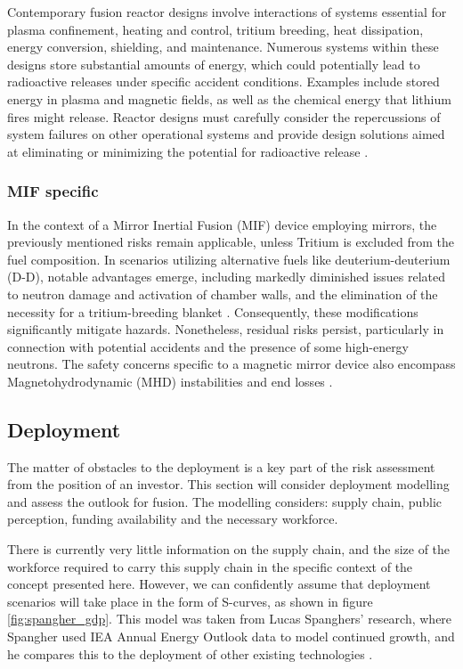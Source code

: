 Contemporary fusion reactor designs involve interactions of systems essential for plasma confinement, heating and control, tritium breeding, heat dissipation, energy conversion, shielding, and maintenance. Numerous systems within these designs store substantial amounts of energy, which could potentially lead to radioactive releases under specific accident conditions. Examples include stored energy in plasma and magnetic fields, as well as the chemical energy that lithium fires might release. Reactor designs must carefully consider the repercussions of system failures on other operational systems and provide design solutions aimed at eliminating or minimizing the potential for radioactive release \cite{crocker1983safety}.


\subsubsection{MIF specific}

In the context of a Mirror Inertial Fusion (MIF) device employing mirrors, the previously mentioned risks remain applicable, unless Tritium is excluded from the fuel composition. In scenarios utilizing alternative fuels like deuterium-deuterium (D-D), notable advantages emerge, including markedly diminished issues related to neutron damage and activation of chamber walls, and the elimination of the necessity for a tritium-breeding blanket \cite{post1980magnetic}. Consequently, these modifications significantly mitigate hazards. Nonetheless, residual risks persist, particularly in connection with potential accidents and the presence of some high-energy neutrons. The safety concerns specific to a magnetic mirror device also encompass Magnetohydrodynamic (MHD) instabilities and end losses \cite{post1980magnetic}. 

\subsection{Deployment}

The matter of obstacles to the deployment is a key part of the risk assessment from the position of an investor. This section will consider deployment modelling and assess the outlook for fusion. The modelling considers: supply chain, public perception, funding availability and the necessary workforce. 

There is currently very little information on the supply chain, and the size of the workforce required to carry this supply chain in the specific context of the concept presented here. However, we can confidently assume that deployment scenarios will take place in the form of S-curves, as shown in figure \ref{fig:spangher_gdp}. This model was taken from Lucas Spanghers’ research, where Spangher used IEA Annual Energy Outlook data to model continued growth, and he compares this to the deployment of other existing technologies \cite{spangher2019characterizing}. 

